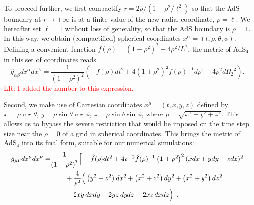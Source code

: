 \documentclass[a4paper,11pt]{article}
\numberwithin{equation}{section}
\begin{document}
To proceed further, we first compactify $r=2\rho/(1-\rho^2/\ell^2)$ so that the AdS boundary at $r \rightarrow +\infty$ is at a finite value of the new radial coordinate, $\rho=\ell$.
We hereafter set $\ell=1$ without loss of generality, so that the AdS boundary is $\rho=1$. In this way, we obtain (compactified) spherical coordinates $x^\alpha=(t,\rho,\theta,\phi)$.
Defining a convenient function $\hat{f}(\rho) = (1-\rho^2)^2+4\rho^2/L^2$, the metric of AdS$_4$ in this set of coordinates reads 
\begin{equation}\label{eqn:ads4_compact}
\hat{g}_{\alpha\beta}dx^{\alpha}dx^{\beta} = \frac{1}{(1-\rho^2)^2} \left( -\hat{f}(\rho) dt^2 + 4(1+\rho^2)^2 \hat{f}(\rho)^{-1} d\rho^2 + 4\rho^2 d{\Omega_2}^2 \right).
\end{equation}
\textcolor{red}{LR: I added the number to this expression.}

Second, we make use of Cartesian coordinates $x^\mu=(t,x,y,z)$ defined by $x=\rho\cos\theta$, $y=\rho\sin\theta\cos\phi$,  $z=\rho\sin\theta\sin\phi$, where $\rho=\sqrt{x^2+y^2+z^2}$.
This allows us to bypass the severe restriction that would be imposed on the time step size near the $\rho=0$ of a grid in spherical coordinates.
This brings the metric of AdS$_4$ into its final form, suitable for our numerical simulations:
\begin{eqnarray}\label{eqn:ads4_final}
\hat{g}_{\mu\nu}dx^{\mu}dx^{\nu}=&\frac{1}{\left(1-\rho^2\right)^2 }\Big[ -\hat{f}(\rho)dt^2  +4\rho^{-2}\hat{f}(\rho)^{-1} \left(1+\rho^2\right)^2 (x dx + y dy + z dz)^2  \nonumber \\
&\hspace{0.75cm}+\frac{4}{\rho^2} \Big(\left(y^2+z^2\right) dx^2 + \left(x^2+z^2\right) dy^2 + \left(x^2+y^2\right) dz^2 \nonumber\\
&\hspace{0.75cm}-2 x y\, dx dy - 2 y z\, dy dz - 2 x z\,dx dz\Big)\Big].
\end{eqnarray}
\end{document}
